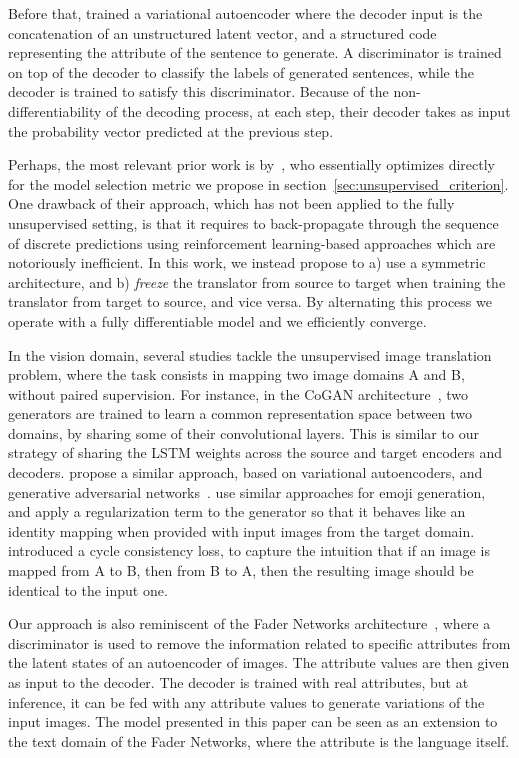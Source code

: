 \documentclass{article} \usepackage{iclr2018_conference,times}
\begin{document}
Before that, \citet{hu2017controllable} trained a variational autoencoder \citep{kingma2013auto} where the decoder input is the concatenation of an unstructured latent vector, and a structured code representing the attribute of the sentence to generate. A discriminator is trained on top of the decoder to classify the labels of generated sentences, while the decoder is trained to satisfy this discriminator. Because of the non-differentiability of the decoding process, at each step, their decoder takes as input the probability vector predicted at the previous step.

Perhaps, the most relevant prior work is by~\cite{he2016dual}, who essentially optimizes directly for the model selection metric we propose in section~\ref{sec:unsupervised_criterion}. One drawback of their approach, which has not been applied to the fully unsupervised setting, is that it requires to back-propagate through the sequence of discrete predictions using reinforcement learning-based approaches which are notoriously inefficient. In this work, we instead propose to a) use a symmetric architecture, and b) \textit{freeze} the translator from source to target when training the translator from target to source, and vice versa. By alternating this process we operate with a fully differentiable model and we efficiently converge.

In the vision domain, several studies tackle the unsupervised image translation problem, where the task consists in mapping two image domains A and B, without paired supervision. For instance, in the CoGAN architecture~\citep{liu2016coupled}, two generators are trained to learn a common representation space between two domains, by sharing some of their convolutional layers. This is similar to our strategy of sharing the LSTM weights across the source and target encoders and decoders. \citet{liu2017unsupervised} propose a similar approach, based on variational autoencoders, and generative adversarial networks~\citep{goodfellow2014generative}. \citet{taigman2016unsupervised} use similar approaches for emoji generation, and apply a regularization term to the generator so that it behaves like an identity mapping when provided with input images from the target domain. \citet{zhu2017unpaired} introduced a cycle consistency loss, to capture the intuition that if an image is mapped from A to B, then from B to A, then the resulting image should be identical to the input one.

Our approach is also reminiscent of the Fader Networks architecture~\citep{lample2017fader}, where a discriminator is used to remove the information related to specific attributes from the latent states of an autoencoder of images. The attribute values are then given as input to the decoder. The decoder is trained with real attributes, but at inference, it can be fed with any attribute values to generate variations of the input images. The model presented in this paper can be seen as an extension to the text domain of the Fader Networks, where the attribute is the language itself.
\end{document}
